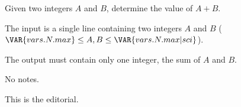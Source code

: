 Given two integers $A$ and $B$, determine the value of $A + B$.

The input is a single line containing two integers $A$ and $B$ ($\VAR{vars.N.max} \leq A, B \leq \VAR{vars.N.max | sci}$).

The output must contain only one integer, the sum of $A$ and $B$.

No notes.

This is the editorial.
